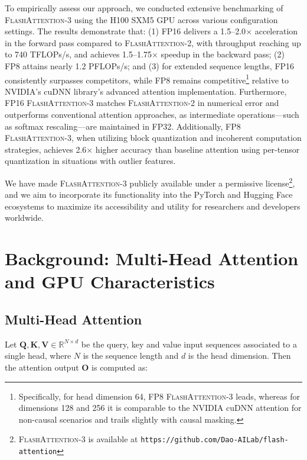 To empirically assess our approach, we conducted extensive benchmarking of \textsc{FlashAttention-3} using the H100 SXM5 GPU across various configuration settings. The results demonstrate that: (1) FP16 delivers a 1.5–2.0$\times$ acceleration in the forward pass compared to \textsc{FlashAttention-2}, with throughput reaching up to 740 TFLOPs/s, and achieves 1.5–1.75$\times$ speedup in the backward pass; (2) FP8 attains nearly 1.2 PFLOPs/s; and (3) for extended sequence lengths, FP16 consistently surpasses competitors, while FP8 remains competitive\footnote{Specifically, for head dimension 64, FP8 \textsc{FlashAttention-3} leads, whereas for dimensions 128 and 256 it is comparable to the NVIDIA cuDNN attention for non-causal scenarios and trails slightly with causal masking.} relative to NVIDIA’s cuDNN library’s advanced attention implementation. Furthermore, FP16 \textsc{FlashAttention-3} matches \textsc{FlashAttention-2} in numerical error and outperforms conventional attention approaches, as intermediate operations—such as softmax rescaling—are maintained in FP32. Additionally, FP8 \textsc{FlashAttention-3}, when utilizing block quantization and incoherent computation strategies, achieves 2.6$\times$ higher accuracy than baseline attention using per-tensor quantization in situations with outlier features.

We have made \textsc{FlashAttention-3} publicly available under a permissive license\footnote{\textsc{FlashAttention-3}
  is available at \texttt{https://github.com/Dao-AILab/flash-attention}}, and we aim to incorporate its functionality into the PyTorch and Hugging Face ecosystems to maximize its accessibility and utility for researchers and developers worldwide.

\section{Background: Multi-Head Attention and GPU Characteristics}
\label{sec:background}

\subsection{Multi-Head Attention}
\label{subsec:multi_head_attn}

Let $\mathbf{Q}, \mathbf{K}, \mathbf{V} \in \mathbb{R}^{N \times d}$ be the query, key and value input sequences associated to a single head, where $N$ is the sequence length and $d$ is the head dimension. Then the attention output $\mathbf{O}$ is computed as:

